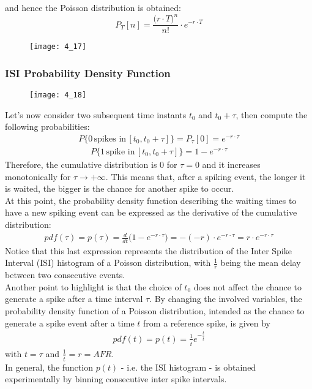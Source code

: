 and hence the Poisson distribution is obtained:
\begin{equation*}
    P_T[n]=\frac{\bigl(r\cdot T\bigr)^n}{n!}\cdot{e^{-r\cdot T}}
\end{equation*}
\begin{figure}[H]
    \texttt{[image: 4\_17]}
    \centering
\end{figure}
\subsubsection{ISI Probability Density Function}
\begin{figure}[H]
    \texttt{[image: 4\_18]}
    \centering
\end{figure}
Let's now consider two subsequent time instants \(t_0\) and \(t_0+\tau\), then compute
the following probabilities:
\begin{align*}
    P\{0\,\text{spikes in}\,[t_0,t_0+\tau]\} = P_{\tau}[0] = e^{-r\cdot\tau}
\end{align*}
\begin{align*}
    P\{1\,\text{spike in}\,[t_0,t_0+\tau]\}
    = 1-e^{-r\cdot\tau}
\end{align*}
Therefore, the cumulative distribution is 0 for \(\tau=0\) and it increases
monotonically for \(\tau\to{+\infty}\). This means that, after a spiking event,
the longer it is waited, the bigger is the chance for another spike to occur.\\
At this point, the probability density function describing the waiting times to
have a new spiking event can be expressed as the derivative of the cumulative
distribution:
\begin{align*}
    pdf(\tau)
    =p(\tau)
    =\frac{d}{dt}\bigl(1-e^{-r\cdot\tau}\bigr)
    =-(-r)\cdot{e^{-r\cdot\tau}}
    =r\cdot{e^{-r\cdot\tau}}
\end{align*}
Notice that this last expression represents the distribution of the Inter Spike
Interval (ISI) histogram of a Poisson distribution, with \(\frac{1}{r}\) being
the mean delay between two consecutive events.\\
Another point to highlight is that the choice of \(t_0\) does not affect the chance
to generate a spike after a time interval \(\tau\).
By changing the involved variables, the probability density function of a
Poisson distribution, intended as the chance to generate a spike event after a time
\(t\) from a reference spike, is given by
\begin{align*}
    pdf(t)
    =p(t)
    =\frac{1}{\overline{t}}e^{-\frac{t}{\overline{t}}}
\end{align*}
with \(t=\tau\) and \(\frac{1}{\overline{t}}=r=AFR\).\\
In general, the function \(p(t)\) - i.e. the ISI histogram - is obtained
experimentally by binning consecutive inter spike intervals.
